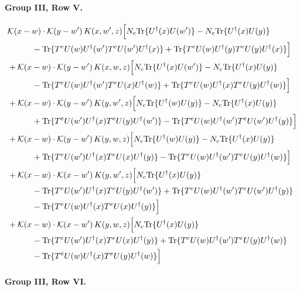 \documentclass[10pt]{article}
\numberwithin{equation}{section}
\begin{document}
\paragraph{Group III, Row V.}

\begin{align}
&\mathcal K(x-w)\cdot\mathcal K(y-w')\,K(x,w',z)\Big[N_c{\rm Tr}\{U^\dagger(x)U(w')\}-N_c{\rm Tr}\{U^\dagger(x)U(y)\}\notag\\
&\quad\quad\quad-{\rm Tr}\{T^eU(w)U^\dagger(w')T^eU(w')U^\dagger(x)\}+{\rm Tr}\{T^eU(w)U^\dagger(y)T^eU(y)U^\dagger(x)\}\Big]\notag\\
&+\mathcal K(x-w)\cdot\mathcal K(y-w')\,K(x,w,z)\Big[N_c{\rm Tr}\{U^\dagger(x)U(w')\}-N_c{\rm Tr}\{U^\dagger(x)U(y)\}\notag\\
&\quad\quad\quad-{\rm Tr}\{T^eU(w)U^\dagger(w')T^eU(x)U^\dagger(w)\}+{\rm Tr}\{T^eU(w)U^\dagger(x)T^eU(y)U^\dagger(w)\}\Big]\notag\\
&+\mathcal K(x-w)\cdot\mathcal K(y-w')\,K(y,w',z)\Big[N_c{\rm Tr}\{U^\dagger(w)U(y)\}-N_c{\rm Tr}\{U^\dagger(x)U(y)\}\notag\\
&\quad\quad\quad+{\rm Tr}\{T^eU(w')U^\dagger(x)T^eU(y)U^\dagger(w')\}-{\rm Tr}\{T^eU(w)U^\dagger(w')T^eU(w')U^\dagger(y)\}\Big]\notag\\
&+\mathcal K(x-w)\cdot\mathcal K(y-w')\,K(y,w,z)\Big[N_c{\rm Tr}\{U^\dagger(w)U(y)\}-N_c{\rm Tr}\{U^\dagger(x)U(y)\}\notag\\
&\quad\quad\quad+{\rm Tr}\{T^eU(w')U^\dagger(x)T^eU(x)U^\dagger(y)\}-{\rm Tr}\{T^eU(w)U^\dagger(w')T^eU(y)U^\dagger(w)\}\Big]\notag\\
&+\mathcal K(x-w)\cdot\mathcal K(x-w')\,K(y,w',z)\Big[N_c{\rm Tr}\{U^\dagger(x)U(y)\}\notag\\
&\quad\quad\quad-{\rm Tr}\{T^eU(w')U^\dagger(x)T^eU(y)U^\dagger(w')\}+{\rm Tr}\{T^eU(w)U^\dagger(w')T^eU(w')U^\dagger(y)\}\notag\\
&\quad\quad\quad-{\rm Tr}\{T^eU(w)U^\dagger(x)T^eU(x)U^\dagger(y)\}\Big]\notag\\
&+\mathcal K(x-w)\cdot\mathcal K(x-w')\,K(y,w,z)\Big[N_c{\rm Tr}\{U^\dagger(x)U(y)\}\notag\\
&\quad\quad\quad-{\rm Tr}\{T^eU(w')U^\dagger(x)T^eU(x)U^\dagger(y)\}+{\rm Tr}\{T^eU(w)U^\dagger(w')T^eU(y)U^\dagger(w)\}\notag\\
&\quad\quad\quad-{\rm Tr}\{T^eU(w)U^\dagger(x)T^eU(y)U^\dagger(w)\}\Big]
\label{eq:list19}
\end{align}

\paragraph{Group III, Row VI.}
\end{document}
